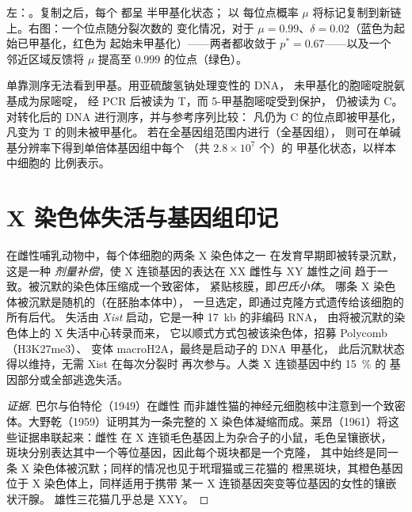 \begin{omfigure}
{\small 左：。复制之后，每个  都呈
半甲基化状态； 以
每位点概率 $\mu$ 将标记复制到新链上。右图：一个位点随分裂次数的
变化情况，对于 $\mu = 0.99$、$\delta = 0.02$（蓝色为起始已甲基化，红色为
起始未甲基化）——两者都收敛于 $p^{*} = 0.67$——以及一个
邻近区域反馈将 $\mu$ 提高至 $0.999$ 的位点（绿色）。}
\end{omfigure}

\begin{method}\label{met:b3:chromatin-epigenetics:bisulfite}
单靠测序无法看到甲基。用亚硫酸氢钠处理变性的 DNA，
未甲基化的胞嘧啶脱氨基成为尿嘧啶，
经 PCR 后被读为 T，而 5-甲基胞嘧啶受到保护，
仍被读为 C。对转化后的 DNA 进行测序，并与参考序列比较：
凡仍为 C 的位点即被甲基化，凡变为 T 的则未被甲基化。
若在全基因组范围内进行（全基因组），
则可在单碱基分辨率下得到单倍体基因组中每个 （共 $2.8\times 10^{7}$ 个）的
甲基化状态，以样本中细胞的
比例表示。
\end{method}

\section{X 染色体失活与基因组印记}

\begin{definition}[X 染色体失活]\label{def:b3:chromatin-epigenetics:x-inactivation}
在雌性哺乳动物中，每个体细胞的两条 X 染色体之一
在发育早期即被转录沉默，这是一种
\emph{剂量补偿}，使 X 连锁基因的表达在 XX 雌性与 XY 雄性之间
趋于一致。被沉默的染色体压缩成一个致密体，
紧贴核膜，即\emph{巴氏小体}。
哪条 X 染色体被沉默是随机的（在胚胎本体中），
一旦选定，即通过克隆方式遗传给该细胞的所有后代。
失活由 \emph{Xist} 启动，它是一种 \qty{17}{kb} 的非编码 RNA，
由将被沉默的染色体上的 X 失活中心转录而来，
它以顺式方式包被该染色体，招募 Polycomb（H3K27me3）、
变体 macroH2A，最终是启动子的 DNA 甲基化，
此后沉默状态得以维持，无需 Xist 在每次分裂时
再次参与。人类 X 连锁基因中约 \qty{15}{\%} 的
基因部分或全部逃逸失活。
\end{definition}

\begin{proof}[证据]
巴尔与伯特伦（1949）在雌性
而非雄性猫的神经元细胞核中注意到一个致密体。大野乾（1959）证明其为一条完整的 X
染色体凝缩而成。莱昂（1961）将这些证据串联起来：雌性
在 X 连锁毛色基因上为杂合子的小鼠，毛色呈镶嵌状，
斑块分别表达其中一个等位基因，因此每个斑块都是一个克隆，
其中始终是同一条 X 染色体被沉默；同样的情况也见于玳瑁猫或三花猫的
橙黑斑块，其橙色基因位于 X 染色体上，同样适用于携带
某一 X 连锁基因突变等位基因的女性的镶嵌状汗腺。
雄性三花猫几乎总是
XXY。
\end{proof}

